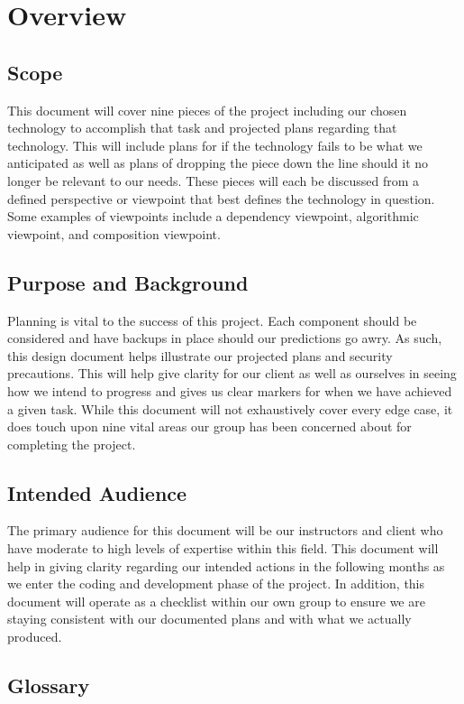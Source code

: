 \documentclass[onecolumn, draftclsnofoot,10pt, compsoc]{IEEEtran}
\begin{document}
\section{Overview}

\subsection{Scope}
This document will cover nine pieces of the project including our chosen technology to accomplish that task and projected plans regarding that technology. This will include plans for if the technology fails to be what we anticipated as well as plans of dropping the piece down the line should it no longer be relevant to our needs. These pieces will each be discussed from a defined perspective or viewpoint that best defines the technology in question. Some examples of viewpoints include a dependency viewpoint, algorithmic viewpoint, and composition viewpoint.

\subsection{Purpose and Background}
Planning is vital to the success of this project. Each component should be considered and have backups in place should our predictions go awry. As such, this design document helps illustrate our projected plans and security precautions. This will help give clarity for our client as well as ourselves in seeing how we intend to progress and gives us clear markers for when we have achieved a given task. While this document will not exhaustively cover every edge case, it does touch upon nine vital areas our group has been concerned about for completing the project. 

\subsection{Intended Audience}
The primary audience for this document will be our instructors and client who have moderate to high levels of expertise within this field. This document will help in giving clarity regarding our intended actions in the following months as we enter the coding and development phase of the project. In addition, this document will operate as a checklist within our own group to ensure we are staying consistent with our documented plans and with what we actually produced. 

\subsection{Glossary}
\end{document}
